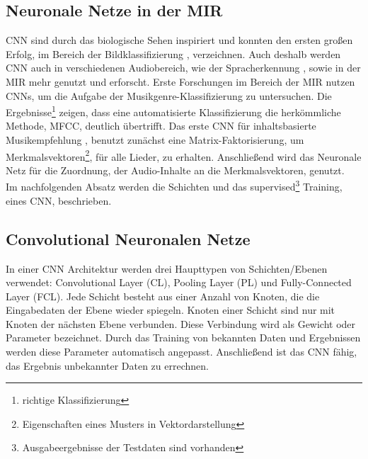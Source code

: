 \documentclass[twosided,a4,10pt]{article}
\begin{document}
\begin{multicols}{2}
		\section{Neuronale Netze in der MIR}
		CNN sind durch das biologische Sehen inspiriert und konnten den ersten großen Erfolg, im Bereich der Bildklassifizierung \cite{alex}, verzeichnen. Auch deshalb werden CNN auch in verschiedenen Audiobereich, wie der Spracherkennung \cite{graves}, sowie in der MIR mehr genutzt und erforscht.\newline
		Erste Forschungen im Bereich der MIR nutzen CNNs, um die Aufgabe der Musikgenre-Klassifizierung \cite{lee} zu untersuchen. Die Ergebnisse\footnote[8]{richtige Klassifizierung} zeigen, dass eine automatisierte Klassifizierung die herkömmliche Methode, MFCC, deutlich übertrifft. Das erste CNN für inhaltsbasierte Musikempfehlung \cite{oord}, benutzt zunächst eine Matrix-Faktorisierung, um Merkmalsvektoren\footnote[9]{Eigenschaften eines Musters in Vektordarstellung}, für alle Lieder, zu erhalten. Anschließend wird das Neuronale Netz für die Zuordnung, der Audio-Inhalte an die Merkmalsvektoren, genutzt. \cite{wang}\newline\\
		Im nachfolgenden Absatz werden die Schichten und das supervised\footnote[10]{Ausgabeergebnisse der Testdaten sind vorhanden} Training, eines CNN, beschrieben.
		\subsection{Convolutional Neuronalen Netze}
		In einer CNN Architektur werden drei Haupttypen von Schichten/Ebenen verwendet: Convolutional Layer (CL), Pooling Layer (PL) und Fully-Connected Layer (FCL). Jede Schicht besteht aus einer Anzahl von Knoten, die die Eingabedaten der Ebene wieder spiegeln. Knoten einer Schicht sind nur mit Knoten der nächsten Ebene verbunden. Diese Verbindung wird als Gewicht oder Parameter bezeichnet. Durch das Training von bekannten Daten und Ergebnissen werden diese Parameter automatisch angepasst. Anschließend ist das CNN fähig, das Ergebnis unbekannter Daten zu errechnen.

\end{multicols}
\end{document}
